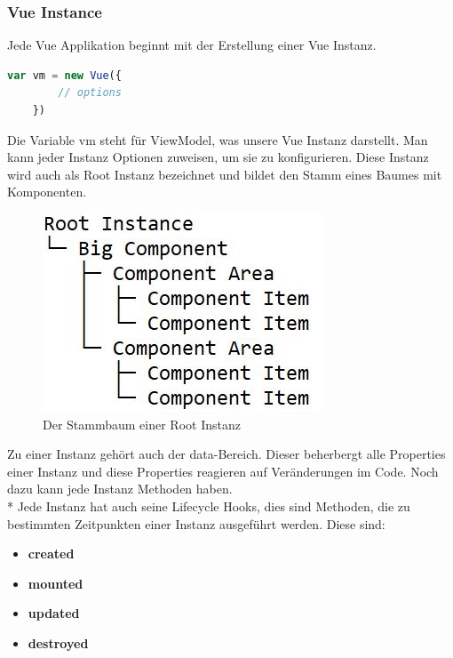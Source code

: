 \clearpage

\subsubsection{Vue Instance}

Jede Vue Applikation beginnt mit der Erstellung einer Vue Instanz.

\begin{lstlisting}[language=JavaScript,caption=Vue Instanz,label=lst:impl:foo]
    var vm = new Vue({
        // options
    }) 
\end{lstlisting}

Die Variable vm steht für ViewModel, was unsere Vue Instanz darstellt. Man kann jeder Instanz Optionen zuweisen, um sie zu konfigurieren.
Diese Instanz wird auch als Root Instanz bezeichnet und bildet den Stamm eines Baumes mit Komponenten. 

\begin{figure}[htp]
    \centering
    \includegraphics[scale=1]{pics/RootComponentTree.JPG}
    \caption{Der Stammbaum einer Root Instanz}
    \label{fig:impl:RootComponentTree}
\end{figure}
Zu einer Instanz gehört auch der data-Bereich. Dieser beherbergt alle Properties einer
Instanz und diese Properties reagieren auf Veränderungen im Code. Noch dazu kann jede Instanz Methoden haben. \\*
Jede Instanz hat auch seine Lifecycle Hooks, dies sind Methoden, die zu bestimmten Zeitpunkten einer Instanz ausgeführt werden. \cite{VueGuideInstance}
Diese sind:
\begin{itemize}
    \item \textbf{created}
    \item \textbf{mounted}          
    \item \textbf{updated} 
    \item \textbf{destroyed} 
\end{itemize}
\clearpage

